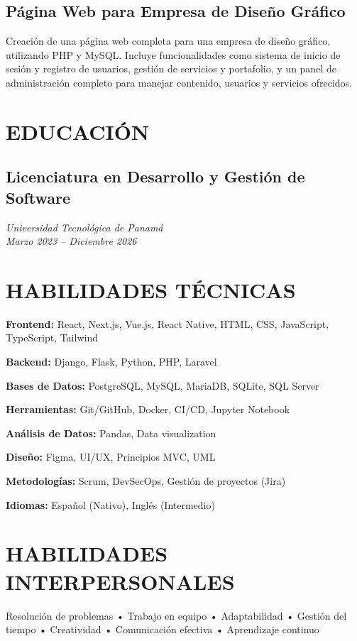 \documentclass[11pt,a4paper]{article}
\begin{document}
\vspace{4pt}

\subsection*{Página Web para Empresa de Diseño Gráfico}
Creación de una página web completa para una empresa de diseño gráfico, utilizando PHP y MySQL. Incluye funcionalidades como sistema de inicio de sesión y registro de usuarios, gestión de servicios y portafolio, y un panel de administración completo para manejar contenido, usuarios y servicios ofrecidos.

\section*{EDUCACIÓN}

\subsection*{Licenciatura en Desarrollo y Gestión de Software}
\textit{Universidad Tecnológica de Panamá}\\
\textit{Marzo 2023 -- Diciembre 2026}

\section*{HABILIDADES TÉCNICAS}

\textbf{Frontend:} React, Next.js, Vue.js, React Native, HTML, CSS, JavaScript, TypeScript, Tailwind

\textbf{Backend:} Django, Flask, Python, PHP, Laravel

\textbf{Bases de Datos:} PostgreSQL, MySQL, MariaDB, SQLite, SQL Server

\textbf{Herramientas:} Git/GitHub, Docker, CI/CD, Jupyter Notebook

\textbf{Análisis de Datos:} Pandas, Data visualization

\textbf{Diseño:} Figma, UI/UX, Principios MVC, UML

\textbf{Metodologías:} Scrum, DevSecOps, Gestión de proyectos (Jira)

\textbf{Idiomas:} Español (Nativo), Inglés (Intermedio)

\section*{HABILIDADES INTERPERSONALES}

Resolución de problemas • Trabajo en equipo • Adaptabilidad • Gestión del tiempo • Creatividad • Comunicación efectiva • Aprendizaje continuo
\end{document}
